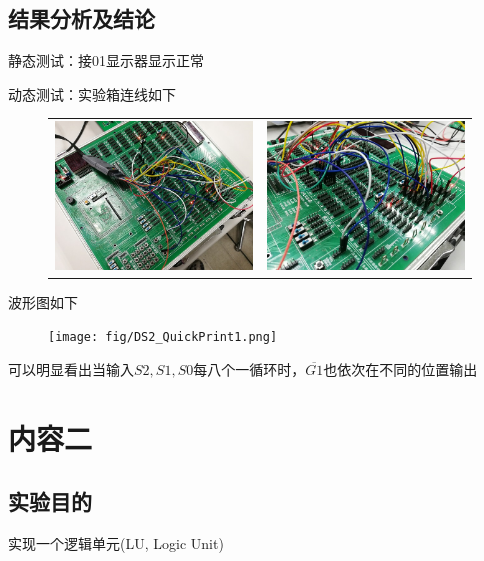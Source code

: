 \documentclass[11pt,UTF8]{ctexart}
\begin{document}
\subsection{结果分析及结论}
\par 静态测试：接01显示器显示正常
\par 动态测试：实验箱连线如下
\begin{figure}[H]
    \centering
    \begin{tabular}{cc}
    \includegraphics[width=0.5\linewidth]{fig/p1.jpg}&
    \includegraphics[width=0.5\linewidth]{fig/p1-1.jpg}
    \end{tabular}
\end{figure}
\par 波形图如下
\begin{figure}[H]
    \centering
    \texttt{[image: fig/DS2\_QuickPrint1.png]}
\end{figure}
\par 可以明显看出当输入$S2,S1,S0$每八个一循环时，$\overline{G1}$也依次在不同的位置输出


\section{内容二}
\subsection{实验目的}
实现一个逻辑单元(LU, Logic Unit)
\end{document}

